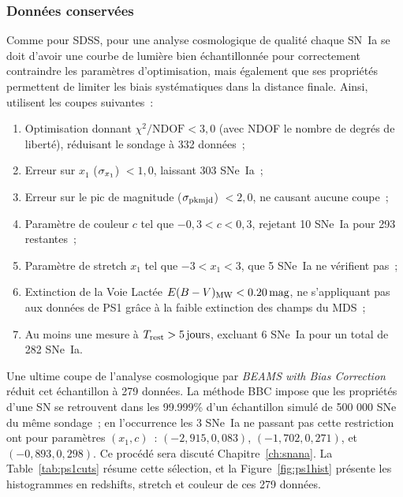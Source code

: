 \documentclass[../main/main.tex]{subfiles}
\begin{document}
\subsubsection{Données conservées}\label{ssec:ps1data}

Comme pour SDSS, pour une analyse cosmologique de qualité chaque SN~Ia se doit
d'avoir une courbe de lumière bien échantillonnée pour correctement contraindre
les paramètres d'optimisation, mais également que ses propriétés permettent de
limiter les biais systématiques dans la distance finale.
Ainsi,~\cite{scolnic2018} utilisent les coupes suivantes~:
\begin{enumerate}
    \item Optimisation donnant $\chi^2/\mathrm{NDOF} < 3,0$ (avec NDOF le nombre
        de degrés de liberté), réduisant le sondage à 332 données~;
    \item Erreur sur $x_1$ ($\sigma_{x_1}$) $< 1,0$, laissant 303 SNe~Ia~;
    \item Erreur sur le pic de magnitude ($\sigma_{\rm pkmjd}$) $< 2,0$, ne causant
        aucune coupe~;
    \item Paramètre de couleur $c$ tel que $-0,3 < c < 0,3$, rejetant 10 SNe~Ia
        pour 293 restantes~;
    \item Paramètre de stretch $x_1$ tel que $-3 < x_1 < 3$, que 5 SNe~Ia ne
        vérifient pas~;
    \item Extinction de la Voie Lactée $E(B-V)_{\rm MW}< \SI{0,20}{mag}$, ne
        s'appliquant pas aux données de PS1 grâce à la faible extinction des
        champs du MDS~;
    \item Au moins une mesure à $T_{\rm rest} > \SI{5}{jours}$, excluant 6
        SNe~Ia pour un total de 282 SNe~Ia.
\end{enumerate}
Une ultime coupe de l'analyse cosmologique par \textit{BEAMS with Bias
Correction}~\citep[BBC,][]{kessler2017} réduit cet échantillon à 279 données. La
méthode BBC impose que les propriétés d'une SN se retrouvent dans les 99.999\%
d'un échantillon simulé de 500 000 SNe du même sondage~; en l'occurrence les 3
SNe~Ia ne passant pas cette restriction ont pour paramètres $(x_1,c)$~:
$(−2,915, 0,083)$, $(−1,702, 0,271)$, et $(−0,893, 0,298)$. Ce procédé sera
discuté Chapitre~\ref{ch:snana}. La Table~\ref{tab:ps1cuts} résume cette
sélection, et la Figure~\ref{fig:ps1hist} présente les histogrammes en
redshifts, stretch et couleur de ces 279 données.
\end{document}
